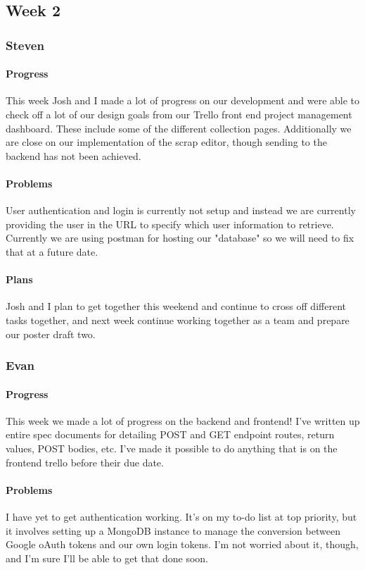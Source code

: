 \documentclass[onecolumn, draftclsnofoot,10pt, compsoc]{IEEEtran}
\begin{document}
\subsection{Week 2}
	\subsubsection{Steven}
	
	\paragraph{Progress}
	This week Josh and I made a lot of progress on our development and were able to check off a lot of our design goals from our Trello front end project management dashboard. These include some of the different collection pages. Additionally we are close on our implementation of the scrap editor, though sending to the backend has not been achieved.
	
	
	\paragraph{Problems}
	User authentication and login is currently not setup and instead we are currently providing the user in the URL to specify which user information to retrieve. Currently we are using postman for hosting our "database" so we will need to fix that at a future date.
	
	
	\paragraph{Plans}
	Josh and I plan to get together this weekend and continue to cross off different tasks together, and next week continue working together as a team and prepare our poster draft two.
	
	
	\subsubsection{Evan}
	
	\paragraph{Progress}
	This week we made a lot of progress on the backend and frontend! I've written up entire spec documents for detailing POST and GET endpoint routes, return values, POST bodies, etc. I've made it possible to do anything that is on the frontend trello before their due date. 
	
	\paragraph{Problems}
	I have yet to get authentication working. It's on my to-do list at top priority, but it involves setting up a MongoDB instance to manage the conversion between Google oAuth tokens and our own login tokens. I'm not worried about it, though, and I'm sure I'll be able to get that done soon.
	
\end{document}
